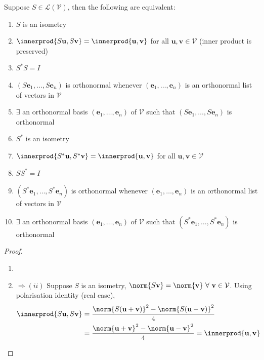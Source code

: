 \begin{theorem} \label{thm:characterisationofisometry} Suppose $S \in \mathcal{L}(\mathcal{V})$, then the following are equivalent:
\begin{enumerate}[label=\roman*.]
\setlength{\itemsep}{0pt}
\item $S$ is an isometry
\item $\innerprod{S \mathbf{u}, S \mathbf{v}} = \innerprod{\mathbf{u}, \mathbf{v}}$ for all $\mathbf{u}, \mathbf{v} \in \mathcal{V}$ (inner product is preserved)
\item $S^* S = I$
\item $(S \mathbf{e}_1, \ldots, S \mathbf{e}_n)$ is orthonormal whenever $(\mathbf{e}_1, \ldots, \mathbf{e}_n)$ is an orthonormal list of vectors in $\mathcal{V}$
\item $\exists$ an orthonormal basis $(\mathbf{e}_1, \ldots, \mathbf{e}_n)$ of $\mathcal{V}$ such that $(S \mathbf{e}_1, \ldots, S \mathbf{e}_n)$ is orthonormal
\item $S^*$ is an isometry
\item $\innerprod{S^* \mathbf{u}, S^* \mathbf{v}} = \innerprod{\mathbf{u}, \mathbf{v}}$ for all $\mathbf{u}, \mathbf{v} \in \mathcal{V}$
\item $S S^* = I$
\item $(S^* \mathbf{e}_1, \ldots, S^* \mathbf{e}_n)$ is orthonormal whenever $(\mathbf{e}_1, \ldots, \mathbf{e}_n)$ is an orthonormal list of vectors in $\mathcal{V}$
\item $\exists$ an orthonormal basis $(\mathbf{e}_1, \ldots, \mathbf{e}_n)$ of $\mathcal{V}$ such that $(S^* \mathbf{e}_1, \ldots, S^* \mathbf{e}_n)$ is orthonormal
\end{enumerate}
\begin{proof} 
\begin{enumerate}[label=\roman*.]
\setlength{\itemsep}{0pt}
\item[]
\item[$(i)$]$\Rightarrow (ii)$ Suppose $S$ is an isometry, $\norm{S \mathbf{v}} = \norm{\mathbf{v}} \ \forall \ \mathbf{v} \in \mathcal{V}$. Using polarisation identity (real case),
\begin{align}
\innerprod{S \mathbf{u}, S \mathbf{v}} &= \frac{\norm{S(\mathbf{u} + \mathbf{v})}^2 - \norm{S(\mathbf{u} - \mathbf{v})}^2}{4} \nonumber \\
&= \frac{\norm{\mathbf{u} + \mathbf{v}}^2 - \norm{\mathbf{u} - \mathbf{v}}^2}{4} = \innerprod{\mathbf{u}, \mathbf{v}} \nonumber
\end{align}

\end{enumerate}
\end{proof}
\end{theorem}
